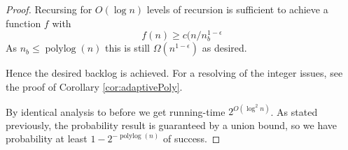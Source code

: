\documentclass[twocolumn]{article}[10pt]
\newcommand{\defn}[1]{{\textit{\textbf{\boldmath #1}}}\xspace}
\DeclareMathOperator{\polylog}{\text{polylog}}
\DeclareMathOperator{\poly}{\text{poly}}
\newtheorem{clm}{Claim}
\begin{document}
\begin{proof}
  Recursing for $O(\log n)$ levels of recursion is sufficient to achieve a function $f$ with 
  $$f(n) \ge c(n/n_b^{1-\epsilon}$$
  As $n_b \le \polylog(n)$ this is still $\Omega(n^{1-\epsilon})$ as desired.

  Hence the desired backlog is achieved. For a resolving of the integer issues,
  see the proof of Corollary \ref{cor:adaptivePoly}.

  By identical analysis to before we get running-time $2^{O(\log^2 n)}$.
  As stated previously, the probability result is guaranteed by a union bound,
  so we have probability at least $1-2^{-\polylog(n)}$ of success.
\end{proof}

\end{document}
